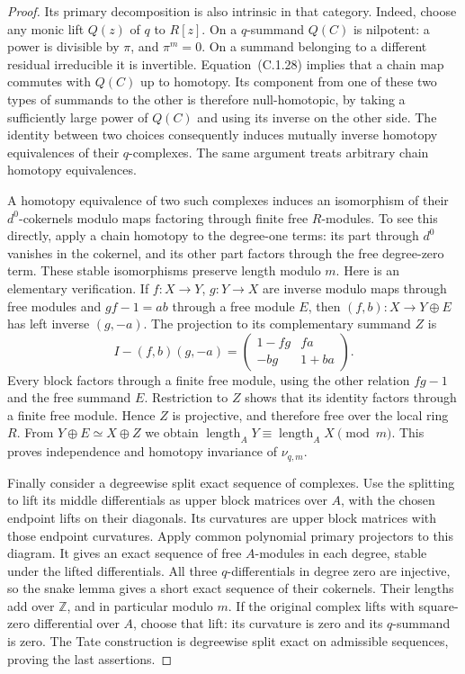 \begin{proof}
Its primary decomposition is also intrinsic in that category.
Indeed, choose any monic lift $Q(z)$ of $q$ to $R[z]$.
On a $q$-summand $Q(C)$ is nilpotent: a power is divisible by $\pi$,
and $\pi^m=0$. On a summand belonging to a different residual
irreducible it is invertible. Equation~\textup{(C.1.28)} implies
that a chain map commutes with $Q(C)$ up to homotopy. Its component
from one of these two types of summands to the other is therefore
null-homotopic, by taking a sufficiently large power of $Q(C)$
and using its inverse on the other side. The identity between two
choices consequently induces mutually inverse homotopy
equivalences of their $q$-complexes. The same argument treats
arbitrary chain homotopy equivalences.

A homotopy equivalence of two such complexes induces an
isomorphism of their $d^0$-cokernels modulo maps factoring through
finite free $R$-modules. To see this directly, apply a chain
homotopy to the degree-one terms: its part through $d^0$ vanishes
in the cokernel, and its other part factors through the free
degree-zero term. These stable isomorphisms preserve length
modulo $m$. Here is an elementary verification. If
$f:X\to Y$, $g:Y\to X$ are inverse modulo maps through free
modules and $gf-1=ab$ through a free module $E$, then
$(f,b):X\to Y\oplus E$ has left inverse $(g,-a)$.
The projection to its complementary summand $Z$ is
\[
 I-(f,b)(g,-a)=
 \begin{pmatrix}1-fg&fa\\-bg&1+ba\end{pmatrix}.
\]
Every block factors through a finite free module, using the other
relation $fg-1$ and the free summand $E$. Restriction to $Z$
shows that its identity factors through a finite free module.
Hence $Z$ is projective, and therefore free
over the local ring $R$. From
$Y\oplus E\simeq X\oplus Z$ we obtain
$\operatorname{length}_A Y\equiv
 \operatorname{length}_A X\pmod m$.
This proves independence and homotopy invariance of $\nu_{q,m}$.

Finally consider a degreewise split exact sequence of complexes.
Use the splitting to lift its middle differentials as upper block
matrices over $A$, with the chosen endpoint lifts on their
diagonals. Its curvatures are upper block matrices with those
endpoint curvatures. Apply common polynomial primary projectors
to this diagram. It gives an exact sequence of free $A$-modules
in each degree, stable under the lifted differentials. All three
$q$-differentials in degree zero are injective, so the snake lemma
gives a short exact sequence of their cokernels. Their lengths
add over $\mathbb Z$, and in particular modulo $m$.
If the original complex lifts with square-zero differential over
$A$, choose that lift: its curvature is zero and its $q$-summand
is zero. The Tate construction is degreewise split exact on
admissible sequences, proving the last assertions.
\end{proof}

